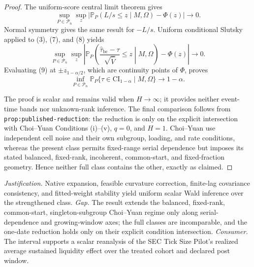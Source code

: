 \documentclass{article}
\begin{document}
\begin{proof}
The uniform-score central limit theorem gives
\[
 \sup_{P\in\mathcal P_n}\sup_z
 \left|\mathbb P_P(L/s\le z\mid M,\Omega)-\Phi(z)\right|\to0.
 \tag{8}
\]
Normal symmetry gives the same result for \(-L/s\).  Uniform conditional Slutsky applied to (3), (7), and (8) yields
\[
 \sup_{P\in\mathcal P_n}\sup_z
 \left|\mathbb P_P\!\left(
 \frac{\widehat\tau_{\mathrm{bc}}-\tau}{\sqrt{\widehat V}}
 \le z\middle|M,\Omega\right)-\Phi(z)\right|\to0.
 \tag{9}
\]
Evaluating (9) at \(\pm z_{1-\alpha/2}\), which are continuity points of \(\Phi\), proves
\[
 \inf_{P\in\mathcal P_n}
 \mathbb P_P\{\tau\in\mathrm{CI}_{1-\alpha}\mid M,\Omega\}
 \longrightarrow1-\alpha.
\]

The proof is scalar and remains valid when \(H\to\infty\); it provides neither event-time bands nor unknown-rank inference.  The final comparison follows from \texttt{prop:published-reduction}: the reduction is only on the explicit intersection with Choi--Yuan Conditions (i)--(v), \(q=0\), and \(H=1\).  Choi--Yuan use independent cell noise and their own subgroup, loading, and rate conditions, whereas the present class permits fixed-range serial dependence but imposes its stated balanced, fixed-rank, incoherent, common-start, and fixed-fraction geometry.  Hence neither full class contains the other, exactly as claimed.
\end{proof}
\par\smallskip\noindent \textit{Justification.} Native expansion, feasible curvature correction, finite-lag covariance consistency, and fitted-weight stability yield uniform scalar Wald inference over the strengthened class. \textit{Gap.} The result extends the balanced, fixed-rank, common-start, singleton-subgroup Choi--Yuan regime only along serial-dependence and growing-window axes; the full classes are incomparable, and the one-date reduction holds only on their explicit condition intersection. \textit{Consumer.} The interval supports a scalar reanalysis of the SEC Tick Size Pilot's realized average sustained liquidity effect over the treated cohort and declared post window.
\end{document}
